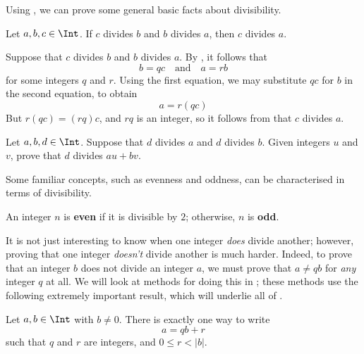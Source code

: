 Using , we can prove some general basic facts about divisibility.

\begin{proposition}
\label{propDivisibilityIsTransitive}
Let $a,b,c \in \Int$. If $c$ divides $b$ and $b$ divides $a$, then $c$ divides $a$.
\end{proposition}

\begin{cproof}
Suppose that $c$ divides $b$ and $b$ divides $a$. By , it follows that
\[ b=qc \quad \text{and} \quad a=rb \]
for some integers $q$ and $r$. Using the first equation, we may substitute $qc$ for $b$ in the second equation, to obtain
\[ a=r(qc) \]
But $r(qc) = (rq)c$, and $rq$ is an integer, so it follows from  that $c$ divides $a$.
\end{cproof}


\begin{exercise}
\label{exDivisibilityIsLinear}
Let $a,b,d \in \Int$. Suppose that $d$ divides $a$ and $d$ divides $b$. Given integers $u$ and $v$, prove that $d$ divides $au+bv$.
\end{exercise}

Some familiar concepts, such as evenness and oddness, can be characterised in terms of divisibility.

\begin{definition}
\label{defEvenOdd}
An integer $n$ is \textbf{even} if it is divisible by $2$; otherwise, $n$ is \textbf{odd}.
\end{definition}

It is not just interesting to know when one integer \textit{does} divide another; however, proving that one integer \textit{doesn't} divide another is much harder. Indeed, to prove that an integer $b$ does not divide an integer $a$, we must prove that $a \ne qb$ for \textit{any} integer $q$ at all. We will look at methods for doing this in ; these methods use the following extremely important result, which will underlie all of .

\begin{theorem}
\label{thmDivisionPreliminary}
Let $a,b \in \Int$ with $b \ne 0$. There is exactly one way to write
\[ a = qb + r \]
such that $q$ and $r$ are integers, and $0 \le r < |b|$.
\end{theorem}

